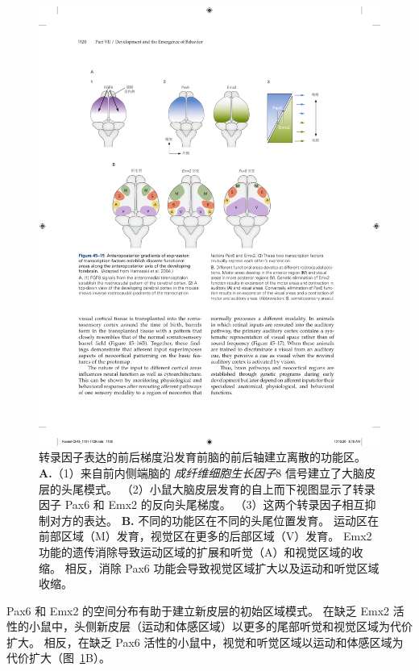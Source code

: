 \begin{figure}[htbp]
	\centering
	\includegraphics[width=1.0\linewidth]{chap45/fig_45_15}
	\caption{转录因子表达的前后梯度沿发育前脑的前后轴建立离散的功能区\cite{hamasaki2004emx2}。
		\textbf{A.}（1）来自前内侧端脑的 \textit{成纤维细胞生长因子}8 信号建立了大脑皮层的头尾模式。
		（2）小鼠大脑皮层发育的自上而下视图显示了转录因子 Pax6 和 Emx2 的反向头尾梯度。
		（3）这两个转录因子相互抑制对方的表达。
		\textbf{B.} 不同的功能区在不同的头尾位置发育。
		运动区在前部区域（M）发育，视觉区在更多的后部区域（V）发育。
		Emx2 功能的遗传消除导致运动区域的扩展和听觉（A）和视觉区域的收缩。
		相反，消除 Pax6 功能会导致视觉区域扩大以及运动和听觉区域收缩。}
	\label{fig:45_15}
\end{figure}


Pax6 和 Emx2 的空间分布有助于建立新皮层的初始区域模式。
在缺乏 Emx2 活性的小鼠中，头侧新皮层（运动和体感区域）以更多的尾部听觉和视觉区域为代价扩大。
相反，在缺乏 Pax6 活性的小鼠中，视觉和听觉区域以运动和体感区域为代价扩大（图~\ref{fig:45_15}B）。


